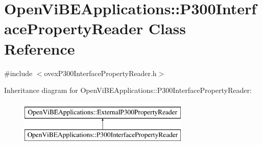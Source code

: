 \hypertarget{classOpenViBEApplications_1_1P300InterfacePropertyReader}{
\section{OpenViBEApplications::P300InterfacePropertyReader Class Reference}
\label{classOpenViBEApplications_1_1P300InterfacePropertyReader}
}


{\ttfamily \#include $<$ovexP300InterfacePropertyReader.h$>$}

Inheritance diagram for OpenViBEApplications::P300InterfacePropertyReader:\begin{figure}[H]
\begin{center}
\leavevmode
\includegraphics[height=2.000000cm]{classOpenViBEApplications_1_1P300InterfacePropertyReader}
\end{center}
\end{figure}
